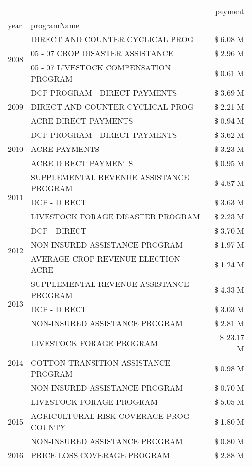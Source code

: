 \begin{tabular}{llr}
\toprule
 &  & payment \\
year & programName &  \\
\midrule
\multirow[t]{3}{*}{2008} & DIRECT AND COUNTER CYCLICAL PROG & \$ 6.08 M \\
 & 05 - 07 CROP DISASTER ASSISTANCE & \$ 2.96 M \\
 & 05 - 07 LIVESTOCK COMPENSATION PROGRAM & \$ 0.61 M \\
\cline{1-3}
\multirow[t]{3}{*}{2009} & DCP PROGRAM - DIRECT PAYMENTS & \$ 3.69 M \\
 & DIRECT AND COUNTER CYCLICAL PROG & \$ 2.21 M \\
 & ACRE DIRECT PAYMENTS & \$ 0.94 M \\
\cline{1-3}
\multirow[t]{3}{*}{2010} & DCP PROGRAM - DIRECT PAYMENTS & \$ 3.62 M \\
 & ACRE PAYMENTS & \$ 3.23 M \\
 & ACRE DIRECT PAYMENTS & \$ 0.95 M \\
\cline{1-3}
\multirow[t]{3}{*}{2011} & SUPPLEMENTAL REVENUE ASSISTANCE PROGRAM & \$ 4.87 M \\
 & DCP - DIRECT & \$ 3.63 M \\
 & LIVESTOCK FORAGE DISASTER PROGRAM & \$ 2.23 M \\
\cline{1-3}
\multirow[t]{3}{*}{2012} & DCP - DIRECT & \$ 3.70 M \\
 & NON-INSURED ASSISTANCE PROGRAM & \$ 1.97 M \\
 & AVERAGE CROP REVENUE ELECTION-ACRE & \$ 1.24 M \\
\cline{1-3}
\multirow[t]{3}{*}{2013} & SUPPLEMENTAL REVENUE ASSISTANCE PROGRAM & \$ 4.33 M \\
 & DCP - DIRECT & \$ 3.03 M \\
 & NON-INSURED ASSISTANCE PROGRAM & \$ 2.81 M \\
\cline{1-3}
\multirow[t]{3}{*}{2014} & LIVESTOCK FORAGE PROGRAM & \$ 23.17 M \\
 & COTTON TRANSITION ASSISTANCE PROGRAM & \$ 0.98 M \\
 & NON-INSURED ASSISTANCE PROGRAM & \$ 0.70 M \\
\cline{1-3}
\multirow[t]{3}{*}{2015} & LIVESTOCK FORAGE PROGRAM & \$ 5.05 M \\
 & AGRICULTURAL RISK COVERAGE PROG - COUNTY & \$ 1.80 M \\
 & NON-INSURED ASSISTANCE PROGRAM & \$ 0.80 M \\
\cline{1-3}
\multirow[t]{3}{*}{2016} & PRICE LOSS COVERAGE PROGRAM & \$ 2.88 M \\

\end{tabular}
